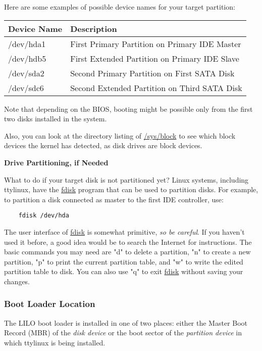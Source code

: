 \documentclass[10pt]{article}
\begin{document}
Here are some examples of possible device names for your target partition:

\begin{center}
\begin{tabular}{l|l}
Device Name & Description \\
\hline
/dev/hda1 & First Primary Partition on Primary IDE Master \\
/dev/hdb5 & First Extended Partition on Primary IDE Slave \\
/dev/sda2 & Second Primary Partition on First SATA Disk   \\
/dev/sdc6 & Second Extended Partition on Third SATA Disk  \\
\end{tabular}
\end{center}

Note that depending on the BIOS, booting might be possible only from the first
two disks installed in the system.

Also, you can look at the directory listing of \url{/sys/block} to see which
block devices the kernel has detected, as disk drives are block devices.

{\bf Drive Partitioning, if Needed}

What to do if your target disk is not partitioned yet? Linux systems, including
ttylinux, have the \url{fdisk} program that can be used to partition disks. For
example, to partition a disk connected as master to the first IDE controller,
use:

\begin{lstlisting}
	fdisk /dev/hda
\end{lstlisting}

The user interface of \url{fdisk} is somewhat primitive, {\it so be careful}.
If you haven't used it before, a good idea would be to search the Internet for
instructions. The basic commands you may need are "d" to delete a partition,
"n" to create a new partition, "p" to print the current partition table, and
"w" to write the edited partition table to disk. You can also use "q" to exit
\url{fdisk} without saving your changes.

\subsubsection{Boot Loader Location}

The LILO boot loader is installed in one of two places: either the Master Boot
Record (MBR) of the {\it disk device} or the boot sector of the {\it partition
device} in which ttylinux is being installed.
\end{document}
